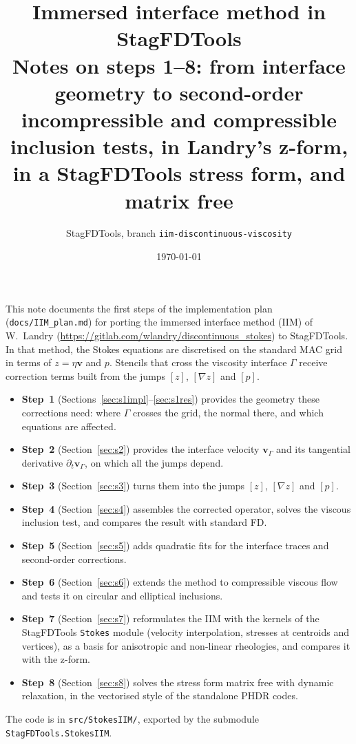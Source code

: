\documentclass[11pt,a4paper]{article}
\title{Immersed interface method in StagFDTools\\[2pt]
\large Notes on steps 1--8: from interface geometry to second-order incompressible and
compressible inclusion tests, in Landry's z-form, in a StagFDTools stress form, and matrix free}
\author{StagFDTools, branch \texttt{iim-discontinuous-viscosity}}
\date{\today}
\newcommand{\code}[1]{\texttt{#1}}
\begin{document}
\maketitle

\noindent This note documents the first steps of the implementation plan
(\texttt{docs/IIM\_plan.md}) for porting the immersed interface method (IIM) of
W.~Landry (\url{https://gitlab.com/wlandry/discontinuous_stokes}) to StagFDTools.
In that method, the Stokes equations are discretised on the standard MAC grid in terms
of $z=\eta\mathbf v$ and $p$. Stencils that cross the viscosity interface $\Gamma$ receive
correction terms built from the jumps $[z]$, $[\nabla z]$ and $[p]$.
\begin{itemize}
  \item \textbf{Step~1} (Sections~\ref{sec:s1impl}--\ref{sec:s1res}) provides the geometry
    these corrections need: where $\Gamma$ crosses the grid, the normal there, and which
    equations are affected.
  \item \textbf{Step~2} (Section~\ref{sec:s2}) provides the interface velocity
    $\mathbf v_\Gamma$ and its tangential derivative $\partial_t\mathbf v_\Gamma$, on which
    all the jumps depend.
  \item \textbf{Step~3} (Section~\ref{sec:s3}) turns them into the jumps $[z]$, $[\nabla z]$
    and $[p]$.
  \item \textbf{Step~4} (Section~\ref{sec:s4}) assembles the corrected operator, solves the
    viscous inclusion test, and compares the result with standard FD.
  \item \textbf{Step~5} (Section~\ref{sec:s5}) adds quadratic fits for the interface traces
    and second-order corrections.
  \item \textbf{Step~6} (Section~\ref{sec:s6}) extends the method to compressible viscous flow
    and tests it on circular and elliptical inclusions.
  \item \textbf{Step~7} (Section~\ref{sec:s7}) reformulates the IIM with the kernels of the
    StagFDTools \code{Stokes} module (velocity interpolation, stresses at centroids and
    vertices), as a basis for anisotropic and non-linear rheologies, and compares it with the
    z-form.
  \item \textbf{Step~8} (Section~\ref{sec:s8}) solves the stress form matrix free with dynamic
    relaxation, in the vectorised style of the standalone PHDR codes.
\end{itemize}
The code is in \code{src/StokesIIM/}, exported by the submodule \code{StagFDTools.StokesIIM}.
\end{document}
